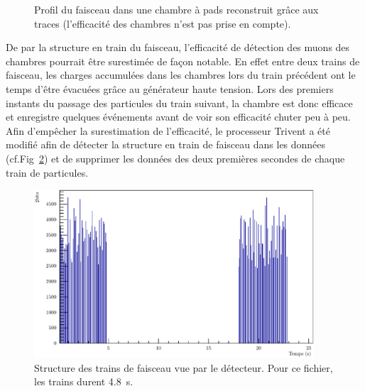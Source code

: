 \begin{figure}[ht!]
	\centering
	\hfill
	\caption{Profil du faisceau dans une chambre à pads reconstruit grâce aux traces (l’efficacité des chambres n’est pas prise en compte).}
	\label{ProfilFaisceauSPS}
\end{figure}

De par la structure en train du faisceau, l'efficacité de détection des muons des chambres pourrait être surestimée de façon notable. En effet entre deux trains de faisceau, les charges accumulées dans les chambres lors du train précédent ont le temps d'être évacuées grâce au générateur haute tension. Lors des premiers instants du passage des particules du train suivant, la chambre est donc efficace et enregistre quelques événements avant de voir son efficacité chuter peu à peu. Afin d'empêcher la surestimation de l'efficacité, le processeur Trivent a été modifié afin de détecter la structure en train de faisceau dans les données (cf.Fig~\ref{StructureSpill}) et de supprimer les données des deux premières secondes de chaque train de particules.
\vspace*{0.4cm}
\begin{figure}[!ht]
	\centering
	\includegraphics[width=0.93\textwidth]{GLA/SpillStructure.pdf}
	\caption{Structure des trains de faisceau vue par le détecteur. Pour ce fichier, les trains durent \SI{4.8}{\second}.}
	\label{StructureSpill}
\end{figure}

